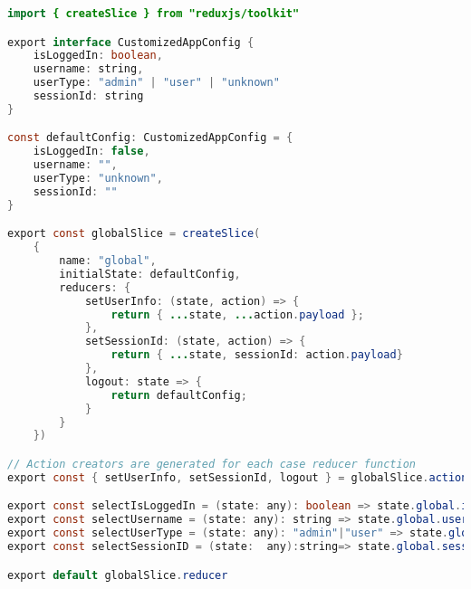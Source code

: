 \begin{lstlisting}[language=Java, caption={Application State}, label={lst:java}]
import { createSlice } from "reduxjs/toolkit"

export interface CustomizedAppConfig {
    isLoggedIn: boolean,
    username: string,
    userType: "admin" | "user" | "unknown"
    sessionId: string
}

const defaultConfig: CustomizedAppConfig = {
    isLoggedIn: false,
    username: "",
    userType: "unknown",
    sessionId: ""
}

export const globalSlice = createSlice(
    {
        name: "global",
        initialState: defaultConfig,
        reducers: {
            setUserInfo: (state, action) => {
                return { ...state, ...action.payload };
            },
            setSessionId: (state, action) => {
                return { ...state, sessionId: action.payload}
            },
            logout: state => { 
                return defaultConfig;    
            }
        }
    })

// Action creators are generated for each case reducer function
export const { setUserInfo, setSessionId, logout } = globalSlice.actions

export const selectIsLoggedIn = (state: any): boolean => state.global.isLoggedIn
export const selectUsername = (state: any): string => state.global.username
export const selectUserType = (state: any): "admin"|"user" => state.global.userType
export const selectSessionID = (state:  any):string=> state.global.sessionId

export default globalSlice.reducer      
\end{lstlisting}
